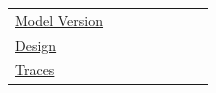 \documentclass[smallextended]{svjour3}
\newcommand{\iconM}{\usebox{\iconMbox}\xspace}
\newcommand{\iconS}{\usebox{\iconSbox}\xspace}
\newcommand{\iconM}{●\xspace}
\newcommand{\iconS}{○\xspace}
\begin{document}
\begin{appendices}
\begin{center}
\begin{tabular}{@{} l c c c c c c c @{}}
  \\
\hyperref[sec:report-model-version-configuration-and-customizations]{Model Version}
  & \iconM %
  & \iconM %
  & \iconM %
  & \iconM %
  & \iconM %
  & \iconM %
  & \iconM %
  \\
\hyperref[sec:report-system-and-prompt-design]{Design}
  & \iconM %
  & \iconM %
  & \iconM %
  & \iconM %
  & \iconS %
  & \iconM %
  & \iconM %
  \\
\hyperref[sec:report-session-traces]{Traces}
  & \iconS %

\end{tabular}
\end{center}
\end{appendices}
\end{document}
